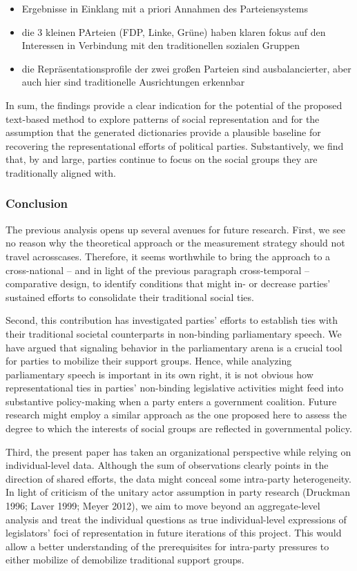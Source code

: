 \documentclass[11pt]{article}
\begin{document}
\begin{itemize}
\item Ergebnisse in Einklang mit a priori Annahmen des Parteiensystems
\item die 3 kleinen PArteien (FDP, Linke, Grüne) haben klaren fokus auf den Interessen in Verbindung mit den traditionellen sozialen Gruppen
\item die Repräsentationsprofile der zwei großen Parteien sind ausbalancierter, aber auch hier sind traditionelle Ausrichtungen erkennbar
\end{itemize}

In sum, the findings provide a clear indication for the potential of the proposed text-based method to explore patterns of social representation and for the assumption that the generated dictionaries provide a plausible baseline for recovering the representational efforts of political parties. Substantively, we find that, by and large, parties continue to focus on the social groups they are traditionally aligned with.

\subsubsection{Conclusion}
\label{sec:org1ed4909}

The previous analysis opens up several avenues for future research. First, we see no reason why the theoretical approach or the measurement strategy should not travel acrosscases. Therefore, it seems worthwhile to bring the approach to a cross-national – and in light of the previous paragraph cross-temporal – comparative design, to identify conditions that might in- or decrease parties’ sustained efforts to consolidate their traditional social ties.

Second, this contribution has investigated parties’ efforts to establish ties with their traditional societal counterparts in non-binding parliamentary speech. We have argued that signaling behavior in the parliamentary arena is a crucial tool for parties to mobilize their support groups. Hence, while analyzing parliamentary speech is important in its own right, it is not obvious how representational ties in parties’ non-binding legislative activities might feed into substantive policy-making when a party enters a government coalition. Future research might employ a similar approach as the one proposed here to assess the degree to which the interests of social groups are reflected in governmental policy.

Third, the present paper has taken an organizational perspective while relying on individual-level data. Although the sum of observations clearly points in the direction of shared efforts, the data might conceal some intra-party heterogeneity. In light of criticism of the unitary actor assumption in party research (Druckman 1996; Laver 1999; Meyer 2012), we aim to move beyond an aggregate-level analysis and treat the individual questions as true individual-level expressions of legislators’ foci of representation in future iterations of this project. This would allow a better understanding of the prerequisites for intra-party pressures to either mobilize of demobilize traditional support groups.
\end{document}
